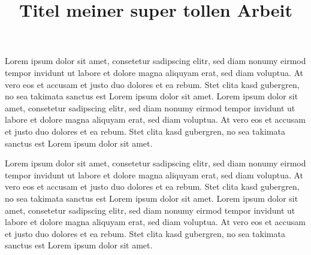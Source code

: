 \documentclass{scrreprt}
\title{Titel meiner super tollen Arbeit}
\begin{document}
\makeWhsThesisTitle
\makeStatutoryDeclaration

\newpage
Lorem ipsum dolor sit amet, consetetur sadipscing elitr, sed diam nonumy eirmod tempor invidunt ut labore et dolore magna aliquyam erat, sed diam voluptua. At vero eos et accusam et justo duo dolores et ea rebum. Stet clita kasd gubergren, no sea takimata sanctus est Lorem ipsum dolor sit amet. Lorem ipsum dolor sit amet, consetetur sadipscing elitr, sed diam nonumy eirmod tempor invidunt ut labore et dolore magna aliquyam erat, sed diam voluptua. At vero eos et accusam et justo duo dolores et ea rebum. Stet clita kasd gubergren, no sea takimata sanctus est Lorem ipsum dolor sit amet.

Lorem ipsum dolor sit amet, consetetur sadipscing elitr, sed diam nonumy eirmod tempor invidunt ut labore et dolore magna aliquyam erat, sed diam voluptua. At vero eos et accusam et justo duo dolores et ea rebum. Stet clita kasd gubergren, no sea takimata sanctus est Lorem ipsum dolor sit amet. Lorem ipsum dolor sit amet, consetetur sadipscing elitr, sed diam nonumy eirmod tempor invidunt ut labore et dolore magna aliquyam erat, sed diam voluptua. At vero eos et accusam et justo duo dolores et ea rebum. Stet clita kasd gubergren, no sea takimata sanctus est Lorem ipsum dolor sit amet.
\end{document}
